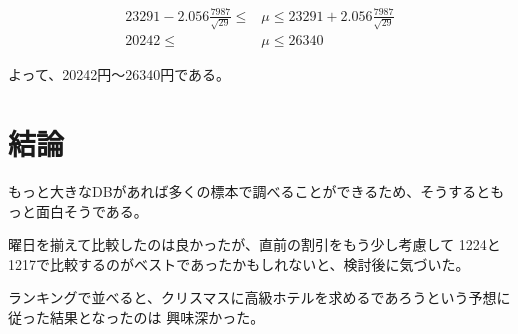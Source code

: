 \documentclass[11pt,a4j]{jsarticle}
\begin{document}
\begin{align*}
  23291 - 2.056 \frac{7987}{\sqrt{29}} \leq &\mu \leq 23291 + 2.056 \frac{7987}{\sqrt{29}} \\
  20242 \leq &\mu \leq 26340
\end{align*}

よって、20242円〜26340円である。

\section{結論}

もっと大きなDBがあれば多くの標本で調べることができるため、そうするともっと面白そうである。

曜日を揃えて比較したのは良かったが、直前の割引をもう少し考慮して
1224と1217で比較するのがベストであったかもしれないと、検討後に気づいた。

ランキングで並べると、クリスマスに高級ホテルを求めるであろうという予想に従った結果となったのは
興味深かった。
\end{document}
